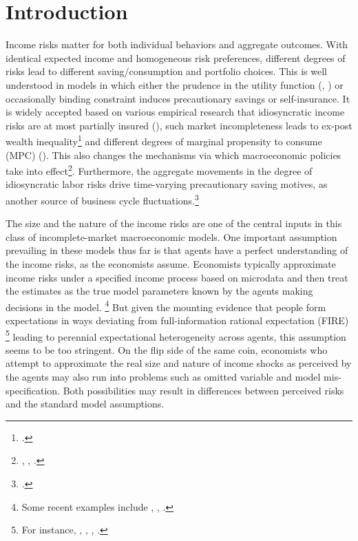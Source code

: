 
    \hypertarget{introduction}{%
\section{Introduction}\label{introduction}}

Income risks matter for both individual behaviors and aggregate
outcomes. With identical expected income and homogeneous risk
preferences, different degrees of risks lead to different
saving/consumption and portfolio choices. This is well understood in
models in which either the prudence in the utility function
(\cite{kimball1990precautionary}, \cite{carroll2001liquidity}) or occasionally binding constraint induces precautionary
savings or self-insurance. It is widely accepted based on various empirical research that
idiosyncratic income risks are at most partially insured
(\cite{blundell_consumption_2008}), such market incompleteness leads
to ex-post wealth inequality\footnote{\cite{ aiyagari1994uninsured,huggett1996wealth,carroll1997nature,krusell1998income}.} and different degrees of marginal
propensity to consume (MPC) (\cite{krueger2016macroeconomics, carroll2017distribution}). This also changes the mechanisms via which macroeconomic policies take into effect\footnote{\cite{krueger2016macroeconomics}, \cite{kaplan2018monetary}, \cite{auclert2019monetary}.}. Furthermore, the aggregate movements in the degree of idiosyncratic labor risks drive time-varying precautionary saving motives, as another source of business cycle fluctuations.\footnote{ \cite{challe2016precautionary, mckay2017time, kaplan2018microeconomic,den2018unemployment,bayer2019precautionary, acharya2020understanding,ravn2021macroeconomic}.}

The size and the nature of the income risks are one of the central inputs in this class of incomplete-market macroeconomic models. One important assumption prevailing in these models thus far is that agents have a perfect understanding of the
income risks, as the economists assume. Economists typically approximate income risks under a specified income process based on microdata and then treat the estimates
as the true model parameters known by the agents making decisions in the
model. \footnote{Some recent examples include \cite{krueger2016macroeconomics}, \cite{bayer2019precautionary}, \cite{kaplan2018monetary}.}
 But given the mounting evidence that people form expectations in ways
deviating from full-information rational expectation (FIRE) \footnote{For instance, \cite{mankiw2003disagreement}, \cite{reis2006inattentive}, \cite{coibion2012can}, \cite{wang2021infvar}.} leading to perennial
expectational heterogeneity across agents, this
assumption seems to be too stringent. On the flip side of the same coin, economists who attempt to approximate the real size and nature of income shocks as perceived by the agents may also run into problems such as omitted variable and model mis-specification. Both possibilities may result in differences between perceived risks and the standard model assumptions. 

